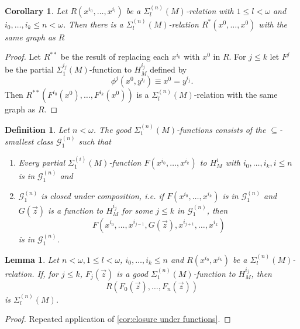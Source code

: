 \documentclass[12pt,a4paper]{article}
\theoremstyle{nicestyle}
\newtheorem{definition}{Definition}[subsection]
\newtheorem{lemma}{Lemma}[subsection]
\newtheorem{corollary}{Corollary}[subsection]
\begin{document}
\begin{corollary}
  Let $R(x^{i_{0}}, \ldots, x^{i_l})$ be a
  $\Sigma^{(n)}_l(M)$-relation with $1 \le l < \omega$ and
  $i_0, \ldots, i_k \le n < \omega$. Then there is a
  $\Sigma^{(n)}_l(M)$-relation $R^{*}(x^{0}, \ldots, x^0)$ with the
  same graph as $R$
\end{corollary}

\begin{proof}
  Let $R^{**}$ be the result of replacing each $x^{i_0}$ with $x^{0}$
  in $R$. For $j \le k$ let $F^j$ be the partial
  $\Sigma^{i_j}_1(M)$-function to $H^{i_j}_{M}$ defined by
  \[
    \phi^{j}(x^{0}, y^{i_{l}}) \equiv x^{0} = y^{i_{j}}.
  \]
  Then $R^{**}(F^{i_{0}}(x^{0}), \ldots, F^{i_{k}}(x^{0}))$ is a
  $\Sigma^{(n)}_l(M)$-relation with the same graph as $R$.
\end{proof}

\begin{definition}
  Let $n < \omega$.  The \emph{good $\Sigma^{(n)}_1(M)$-functions}
  consists of the $\subseteq$-smallest class $\mathcal{G}^{(n)}_1$
  such that
  \begin{enumerate}
  \item Every partial $\Sigma^{(i)}_1(M)$-function
    $F(x^{i_{0}}, \ldots, x^{i_{k}})$ to $H^i_M$ with
    $i_0, \ldots, i_k, i \le n$ is in $\mathcal{G}^{(n)}_{1}$ and
  \item $\mathcal{G}^{(n)}_1$ is closed under composition, i.e. if
    $F(x^{i_{0}}, \ldots, x^{i_k})$ is in $\mathcal{G}^{(n)}_1$ and
    $G(\vec{z})$ is a function to $H^{i_j}_M$ for some $j \le k$ in
    $\mathcal{G}^{(n)}_1$, then
    \[ F(x^{i_{0}}, \ldots, x^{i_{j-1}}, G(\vec{z}), x^{i_{j+1}},
      \ldots, x^{i_{k}})
    \] is in $\mathcal{G}^{(n)}_{1}$.
  \end{enumerate}
\end{definition}

\begin{lemma}
  Let $n < \omega, 1 \le l < \omega$, $i_0, \ldots, i_k \le n$ and
  $R(x^{i_{0}}, x^{i_k})$ be a $\Sigma^{(n)}_l(M)$-relation. If, for
  $j \le k$, $F_j(\vec{z})$ is a good $\Sigma^{(n)}_1(M)$-function to
  $H^{i_j}_M$, then
  \[
    R(F_{0}(\vec{z}), \ldots, F_n(\vec{z}))
  \]
  is $\Sigma^{(n)}_l(M)$.
\end{lemma}

\begin{proof}
  Repeated application of \autoref{cor:closure under functions}.
\end{proof}
\end{document}
